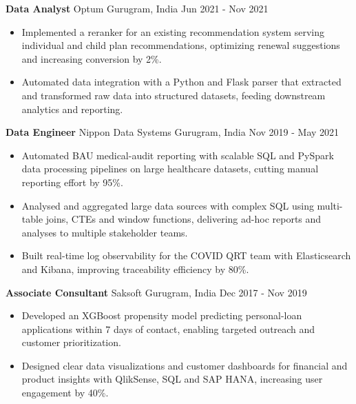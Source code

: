 \documentclass[10pt,a4paper]{article}
\newcommand{\role}[4]{\textbf{#1} \textbar{} #2 \hfill #3 \textbar{} #4\par}
\begin{document}
\vspace{3pt}
\role{Data Analyst}{Optum}{Gurugram, India}{Jun 2021 - Nov 2021}
\begin{itemize}
  \item Implemented a reranker for an existing recommendation system serving individual and child plan recommendations, optimizing renewal suggestions and increasing conversion by 2\%.
  \item Automated data integration with a Python and Flask parser that extracted and transformed raw data into structured datasets, feeding downstream analytics and reporting.
\end{itemize}
\vspace{3pt}
\role{Data Engineer}{Nippon Data Systems}{Gurugram, India}{Nov 2019 - May 2021}
\begin{itemize}
  \item Automated BAU medical-audit reporting with scalable SQL and PySpark data processing pipelines on large healthcare datasets, cutting manual reporting effort by 95\%.
  \item Analysed and aggregated large data sources with complex SQL using multi-table joins, CTEs and window functions, delivering ad-hoc reports and analyses to multiple stakeholder teams.
  \item Built real-time log observability for the COVID QRT team with Elasticsearch and Kibana, improving traceability efficiency by 80\%.
\end{itemize}
\vspace{3pt}
\role{Associate Consultant}{Saksoft}{Gurugram, India}{Dec 2017 - Nov 2019}
\begin{itemize}
  \item Developed an XGBoost propensity model predicting personal-loan applications within 7 days of contact, enabling targeted outreach and customer prioritization.
  \item Designed clear data visualizations and customer dashboards for financial and product insights with QlikSense, SQL and SAP HANA, increasing user engagement by 40\%.
\end{itemize}
\end{document}

